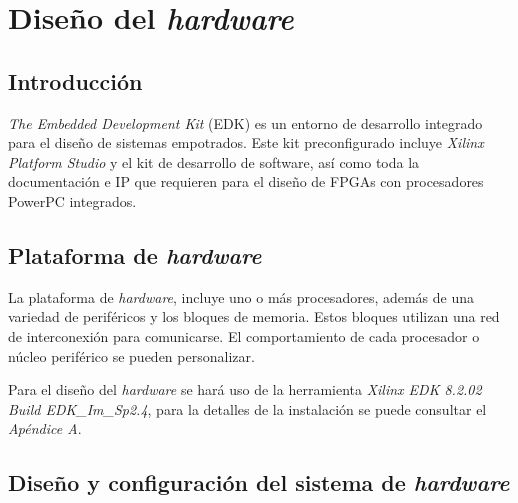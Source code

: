 \chapter{Diseño del \emph{hardware}}

\section{Introducción}

\emph{The Embedded Development Kit} (EDK) es un entorno de desarrollo integrado
para el diseño de sistemas empotrados. Este kit preconfigurado incluye
\emph{Xilinx Platform Studio} y el kit de desarrollo de software, así como toda
la documentación e IP que requieren para el diseño de FPGAs con procesadores
PowerPC integrados.

\section{Plataforma de \emph{hardware}}

La plataforma de \emph{hardware}, incluye uno o más procesadores, además de
una variedad de periféricos y los bloques de memoria. Estos bloques utilizan una
red de interconexión para comunicarse. El comportamiento de cada procesador o
núcleo periférico se pueden personalizar\cite{Beto}.


Para el diseño del \emph{hardware} se hará uso de la herramienta \emph{Xilinx
EDK 8.2.02 Build EDK\_Im\_Sp2.4}, para la detalles de la instalación se puede
consultar el \emph{Apéndice A}.

\section{Diseño y configuración del sistema de \emph{hardware}}

